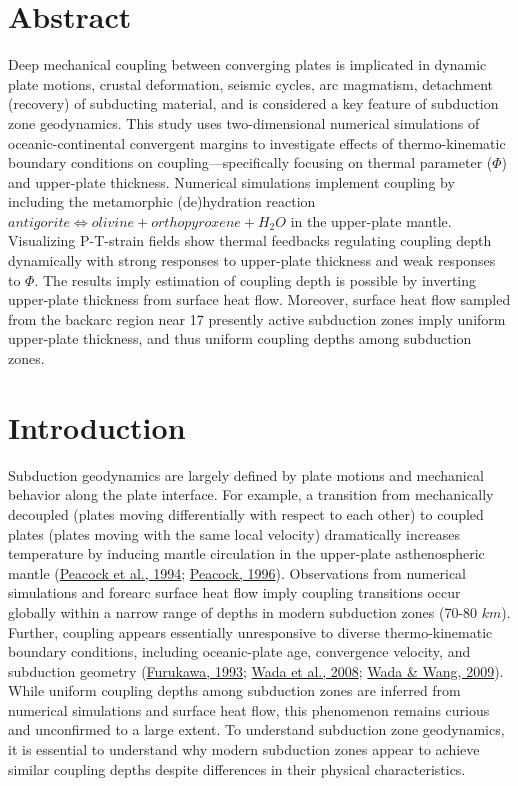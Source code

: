 
\hypertarget{chpt2Abstract}{%
\section{Abstract}\label{chpt2Abstract}}

Deep mechanical coupling between converging plates is implicated in dynamic plate motions, crustal deformation, seismic cycles, arc magmatism, detachment (recovery) of subducting material, and is considered a key feature of subduction zone geodynamics. This study uses two-dimensional numerical simulations of oceanic-continental convergent margins to investigate effects of thermo-kinematic boundary conditions on coupling---specifically focusing on thermal parameter (\(\Phi\)) and upper-plate thickness. Numerical simulations implement coupling by including the metamorphic (de)hydration reaction \(antigorite \allowbreak \Leftrightarrow olivine + orthopyroxene + H_{2}O\) in the upper-plate mantle. Visualizing P-T-strain fields show thermal feedbacks regulating coupling depth dynamically with strong responses to upper-plate thickness and weak responses to \(\Phi\). The results imply estimation of coupling depth is possible by inverting upper-plate thickness from surface heat flow. Moreover, surface heat flow sampled from the backarc region near 17 presently active subduction zones imply uniform upper-plate thickness, and thus uniform coupling depths among subduction zones.

\hypertarget{chpt2Intro}{%
\section{Introduction}\label{chpt2Intro}}

Subduction geodynamics are largely defined by plate motions and mechanical behavior along the plate interface. For example, a transition from mechanically decoupled (plates moving differentially with respect to each other) to coupled plates (plates moving with the same local velocity) dramatically increases temperature by inducing mantle circulation in the upper-plate asthenospheric mantle (\protect\hyperlink{ref-peacock1994}{Peacock et al., 1994}; \protect\hyperlink{ref-peacock1996}{Peacock, 1996}). Observations from numerical simulations and forearc surface heat flow imply coupling transitions occur globally within a narrow range of depths in modern subduction zones (70-80 \(km\)). Further, coupling appears essentially unresponsive to diverse thermo-kinematic boundary conditions, including oceanic-plate age, convergence velocity, and subduction geometry (\protect\hyperlink{ref-furukawa1993}{Furukawa, 1993}; \protect\hyperlink{ref-wada2008}{Wada et al., 2008}; \protect\hyperlink{ref-wada2009}{Wada \& Wang, 2009}). While uniform coupling depths among subduction zones are inferred from numerical simulations and surface heat flow, this phenomenon remains curious and unconfirmed to a large extent. To understand subduction zone geodynamics, it is essential to understand why modern subduction zones appear to achieve similar coupling depths despite differences in their physical characteristics.

